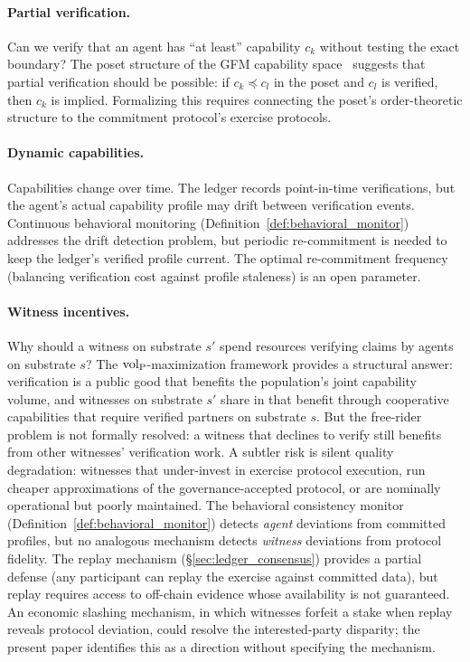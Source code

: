 \paragraph{Partial verification.}
Can we verify that an agent has ``at least'' capability $c_k$ without
testing the exact boundary?  The poset structure of the GFM
capability space~\citep{lasser2026poset} suggests that partial
verification should be possible: if $c_k \preceq c_l$ in the poset
and $c_l$ is verified, then $c_k$ is implied.  Formalizing this
requires connecting the poset's order-theoretic structure to the
commitment protocol's exercise protocols.

\paragraph{Dynamic capabilities.}
Capabilities change over time.  The ledger records point-in-time
verifications, but the agent's actual capability profile may drift
between verification events.  Continuous behavioral monitoring
(Definition~\ref{def:behavioral_monitor}) addresses the drift
detection problem, but periodic re-commitment is needed to keep the
ledger's verified profile current.  The optimal re-commitment
frequency (balancing verification cost against profile staleness) is
an open parameter.

\paragraph{Witness incentives.}
Why should a witness on substrate $s'$ spend resources verifying
claims by agents on substrate $s$?  The ${\operatorname{vol}_{\mathrm{P}}}$-maximization
framework provides a structural answer: verification is a public
good that benefits the population's joint capability volume, and
witnesses on substrate $s'$ share in that benefit through cooperative
capabilities that require verified partners on substrate $s$.  But
the free-rider problem is not formally resolved: a witness that
declines to verify still benefits from other witnesses' verification
work.  A subtler risk is silent quality degradation: witnesses that
under-invest in exercise protocol execution, run cheaper
approximations of the governance-accepted protocol, or are nominally
operational but poorly maintained.  The behavioral consistency monitor
(Definition~\ref{def:behavioral_monitor}) detects \emph{agent}
deviations from committed profiles, but no analogous mechanism
detects \emph{witness} deviations from protocol fidelity.  The
replay mechanism (\S\ref{sec:ledger_consensus}) provides a partial
defense (any participant can replay the exercise against committed
data), but replay requires access to off-chain evidence whose
availability is not guaranteed.  An economic slashing mechanism,
in which witnesses forfeit a stake when replay reveals protocol
deviation, could resolve the interested-party disparity; the present
paper identifies this as a direction without specifying the
mechanism.

